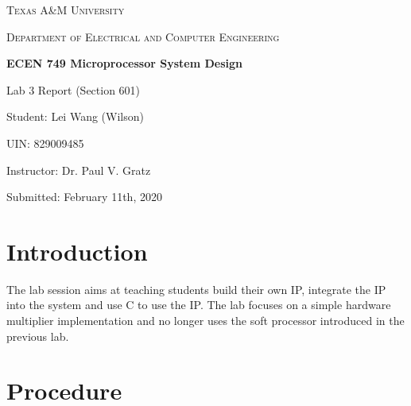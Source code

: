 \documentclass[11pt,letterpaper,titlepage]{article}
\begin{document}
\begin{titlepage}
  \centering
	{\scshape\large Texas A\&M University \par}
	\vspace{1cm}
	{\scshape\Large Department of Electrical and Computer Engineering \par}
	\vspace{4cm}
    \vspace{0.5cm}
	{\huge\bfseries ECEN 749 Microprocessor System Design\par}
	\vspace{4cm}
	{\Large Lab 3 Report (Section 601)\par}
	\vspace{1cm}
	{\Large Student: Lei Wang (Wilson)\par}
	\vspace{1cm}
	{\Large UIN: 829009485\par}
	\vspace{1cm}
	{\Large Instructor: Dr. Paul V. Gratz\par}
	\vspace{4cm}
	\vfill

	{\large Submitted: February 11th, 2020 \par}

\end{titlepage}

\newpage

\tableofcontents{}

\newpage

\part{Introduction}

The lab session aims at teaching students build their own IP, integrate the IP into the system and use C to use the IP. The lab focuses on a simple hardware multiplier implementation and no longer uses the soft processor introduced in the previous lab.

\part{Procedure}
\end{document}
